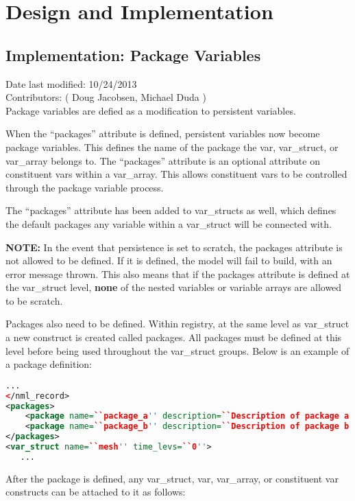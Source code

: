 \documentclass[11pt]{report}
\begin{document}

\chapter{Design and Implementation}
\section{Implementation: Package Variables}
Date last modified: 10/24/2013 \\
Contributors: ( Doug Jacobsen, Michael Duda ) \\

Package variables are defied as a modification to persistent variables. 

When the ``packages'' attribute is defined, persistent variables now become
package variables.  This defines the name of the package the var, var\_struct,
or var\_array belongs to. The ``packages'' attribute is an optional attribute
on constituent vars within a var\_array. This allows constituent vars to be
controlled through the package variable process.  

The ``packages'' attribute has been added to var\_structs as well, which
defines the default packages any variable within a var\_struct will be
connected with.

{\bf NOTE:} In the event that persistence is set to scratch, the packages
attribute is not allowed to be defined. If it is defined, the model will fail
to build, with an error message thrown. This also means that if the packages
attribute is defined at the var\_struct level, {\bf none} of the nested
variables or variable arrays are allowed to be scratch.

Packages also need to be defined. Within registry, at the same level as
var\_struct a new construct is created called packages. All packages must be
defined at this level before being used throughout the var\_struct groups.
Below is an example of a package definition:

{\scriptsize
\begin{lstlisting}[language=XML]
   ...
</nml_record>
<packages>
	<package name=``package_a'' description=``Description of package a''/>
	<package name=``package_b'' description=``Description of package b''/>
</packages>
<var_struct name=``mesh'' time_levs=``0''>
   ...
\end{lstlisting}
}

After the package is defined, any var\_struct, var, var\_array, or constituent
var constructs can be attached to it as follows:
\end{document}
